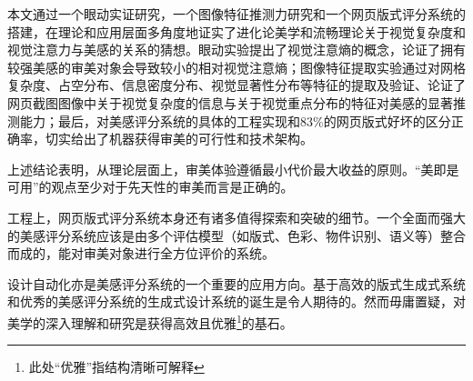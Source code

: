 
\begin{summary}

本文通过一个眼动实证研究，一个图像特征推测力研究和一个网页版式评分系统的搭建，在理论和应用层面多角度地证实了进化论美学和流畅理论关于视觉复杂度和视觉注意力与美感的关系的猜想。眼动实验提出了视觉注意熵的概念，论证了拥有较强美感的审美对象会导致较小的相对视觉注意熵；图像特征提取实验通过对网格复杂度、占空分布、信息密度分布、视觉显著性分布等特征的提取及验证、论证了网页截图图像中关于视觉复杂度的信息与关于视觉重点分布的特征对美感的显著推测能力；最后，对美感评分系统的具体的工程实现和83\%的网页版式好坏的区分正确率，切实给出了机器获得审美的可行性和技术架构。

上述结论表明，从理论层面上，审美体验遵循最小代价最大收益的原则。“美即是可用”的观点至少对于先天性的审美而言是正确的。

工程上，网页版式评分系统本身还有诸多值得探索和突破的细节。一个全面而强大的美感评分系统应该是由多个评估模型（如版式、色彩、物件识别、语义等）整合而成的，能对审美对象进行全方位评价的系统。

设计自动化亦是美感评分系统的一个重要的应用方向。基于高效的版式生成式系统和优秀的美感评分系统的生成式设计系统的诞生是令人期待的。然而毋庸置疑，对美学的深入理解和研究是获得高效且优雅\footnote{此处“优雅”指结构清晰可解释}的基石。

\end{summary}
